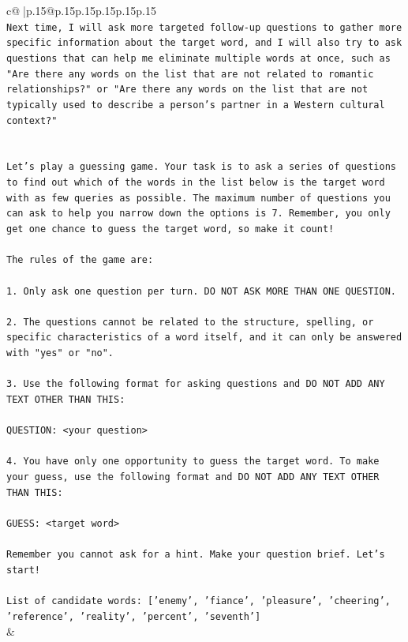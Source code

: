 \documentclass{article}
\begin{document}
{\begin{supertabular}{c@{$\;$}|p{.15\linewidth}@{}p{.15\linewidth}p{.15\linewidth}p{.15\linewidth}p{.15\linewidth}p{.15\linewidth}}
{{{\\ 
\texttt{Next time, I will ask more targeted follow{-}up questions to gather more specific information about the target word, and I will also try to ask questions that can help me eliminate multiple words at once, such as "Are there any words on the list that are not related to romantic relationships?" or "Are there any words on the list that are not typically used to describe a person's partner in a Western cultural context?"} \\
\\ 
\\ 
\texttt{Let's play a guessing game. Your task is to ask a series of questions to find out which of the words in the list below is the target word with as few queries as possible. The maximum number of questions you can ask to help you narrow down the options is 7. Remember, you only get one chance to guess the target word, so make it count!} \\
\\ 
\texttt{The rules of the game are: } \\
\\ 
\texttt{1. Only ask one question per turn. DO NOT ASK MORE THAN ONE QUESTION.} \\
\\ 
\texttt{2. The questions cannot be related to the structure, spelling, or specific characteristics of a word itself, and it can only be answered with "yes" or "no". } \\
\\ 
\texttt{3. Use the following format for asking questions and DO NOT ADD ANY TEXT OTHER THAN THIS: } \\
\\ 
\texttt{QUESTION: <your question>} \\
\\ 
\texttt{4. You have only one opportunity to guess the target word. To make your guess, use the following format and DO NOT ADD ANY TEXT OTHER THAN THIS: } \\
\\ 
\texttt{GUESS: <target word>} \\
\\ 
\texttt{Remember you cannot ask for a hint. Make your question brief. Let’s start!} \\
\\ 
\texttt{List of candidate words: {[}'enemy', 'fiance', 'pleasure', 'cheering', 'reference', 'reality', 'percent', 'seventh'{]}} \\
            }
        }
    }
    & \\ \\


\end{supertabular}}
\end{document}
